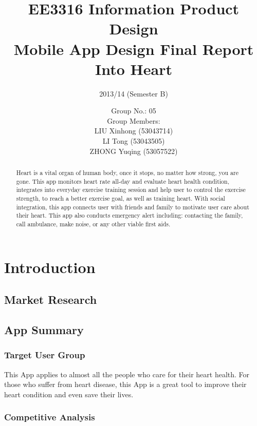 \documentclass[10pt,a4paper,final]{scrartcl}
\author{
Group No.: 05 \\ 
Group Members: \\
LIU Xinhong (53043714) \\
LI Tong (53043505) \\
ZHONG Yuqing (53057522)
}
\title{
EE3316 Information Product Design \\ Mobile App Design Final Report \\ Into Heart}
\subtitle{2013/14 (Semester B)}
\begin{document}
\maketitle

\pagebreak

\begin{abstract}
Heart is a vital organ of human body, once it stops, no matter how strong, you are gone.  
This app monitors heart rate all-day and evaluate heart health condition, integrates into everyday exercise training session and help user to control the exercise strength, to reach a better exercise goal, as well as training heart. With social integration, this app connects user with friends and family to motivate user care about their heart. This app also conducts emergency alert including: contacting the family, call ambulance, make noise, or any other viable first aids. 
\end{abstract}



\tableofcontents

\section{Introduction}

\subsection{Market Research}


\subsection{App Summary}
\subsubsection{Target User Group}
This App applies to almost all the people who care for their heart health. For those who suffer from heart disease, this App is a great tool to improve their heart condition and even save their lives. 
\subsubsection{Competitive Analysis}

\end{document}
